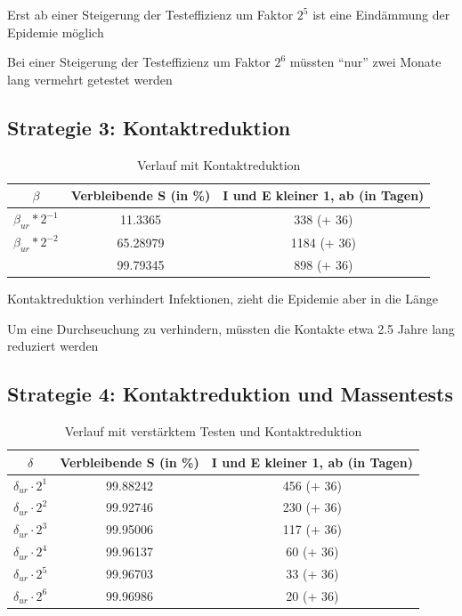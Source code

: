 \documentclass{scrartcl}
\begin{document}
	\begin{arrowlist}
		\item Erst ab einer Steigerung der Testeffizienz um Faktor $2^5$ ist eine Eindämmung der Epidemie möglich
		\item Bei einer Steigerung der Testeffizienz um Faktor $2^6$ müssten \enquote{nur} zwei Monate lang vermehrt getestet werden
	\end{arrowlist}

\subsection{Strategie 3: Kontaktreduktion}
	\begin{table}[h]
		\caption{Verlauf mit Kontaktreduktion}
		\centering
		\begin{tabular}{@{}ccc@{}}
			\toprule
			$\beta$ & Verbleibende S (in \%) & I und E kleiner 1, ab  (in Tagen)\\ 
			\midrule
			$\beta_{ur} * 2^{-1}$ & 11.3365 & 338 (+ 36) \\ 
			$\beta_{ur} * 2^{-2}$  & 65.28979 &  1184 (+ 36)\\  
			\nicefrac{1}{12} & 99.79345 & 898 (+ 36)\\ 
			\bottomrule
		\end{tabular}
	\end{table}

	\begin{arrowlist}
		\item Kontaktreduktion verhindert Infektionen, zieht die Epidemie aber in die Länge
		\item Um eine Durchseuchung zu verhindern, müssten die Kontakte etwa 2.5 Jahre lang reduziert werden
	\end{arrowlist}

\subsection{Strategie 4: Kontaktreduktion und Massentests}
	\begin{table}[h]
		\caption{Verlauf mit verstärktem Testen und Kontaktreduktion}
		\centering
		\begin{tabular}{@{}ccc@{}}
			\toprule
			$\delta$ & Verbleibende S (in \%) & I und E kleiner 1, ab  (in Tagen)\\ 
			\midrule
			 $\delta_{ur} \cdot 2^1$ & 99.88242 & 456 (+ 36) \\ 
			 $\delta_{ur} \cdot 2^2$ & 99.92746 & 230 (+ 36)\\  
			 $\delta_{ur} \cdot 2^3$ & 99.95006 & 117 (+ 36) \\ 
			 $\delta_{ur} \cdot 2^4$ & 99.96137 & 60 (+ 36)\\ 
			 $\delta_{ur} \cdot 2^5$ & 99.96703 & 33 (+ 36)\\ 
			 $\delta_{ur} \cdot 2^6$ & 99.96986 & 20 (+ 36)\\ 
			\bottomrule
		\end{tabular}
	\end{table}
\end{document}
